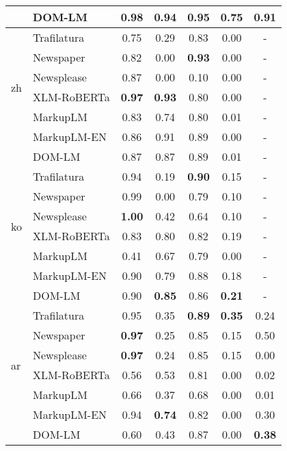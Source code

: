 \begin{tabular}{|l|l|ccccc|}
                    & DOM-LM      & \textbf{0.98} & 0.94 & 0.95 & \textbf{0.75} & \textbf{0.91}  \\ \hline                  
\multirow{6}{*}{zh} & Trafilatura & 0.75 & 0.29 & 0.83 & 0.00 & - \\
                    & Newspaper  & 0.82 & 0.00 & \textbf{0.93} & 0.00 & - \\
                    & Newsplease   & 0.87 & 0.00 & 0.10 & 0.00 & - \\
                    & XLM-RoBERTa & \textbf{0.97} & \textbf{0.93} & 0.80 & 0.00 & - \\
                    & MarkupLM    & 0.83 & 0.74 & 0.80 & 0.01 & -  \\
                    & MarkupLM-EN & 0.86 & 0.91 & 0.89 & 0.00 & -  \\
                    & DOM-LM      & 0.87 & 0.87 & 0.89 & 0.01 & -  \\ \hline
\multirow{6}{*}{ko} & Trafilatura & 0.94 & 0.19 & \textbf{0.90} & 0.15 & - \\
                    & Newspaper  & 0.99 & 0.00 & 0.79 & 0.10 & - \\
                    & Newsplease   & \textbf{1.00} & 0.42 & 0.64 & 0.10 & - \\
                    & XLM-RoBERTa & 0.83 & 0.80 & 0.82 & 0.19 & - \\
                    & MarkupLM    & 0.41 & 0.67 & 0.79 & 0.00 & -  \\
                    & MarkupLM-EN & 0.90 & 0.79 & 0.88 & 0.18 & -  \\
                    & DOM-LM      & 0.90 & \textbf{0.85} & 0.86 & \textbf{0.21} & - \\ \hline
\multirow{6}{*}{ar} & Trafilatura & 0.95 & 0.35 & \textbf{0.89} & \textbf{0.35} & 0.24 \\
                    & Newspaper  & \textbf{0.97} & 0.25 & 0.85 & 0.15 & 0.50 \\
                    & Newsplease   & \textbf{0.97} & 0.24 & 0.85 & 0.15 & 0.00 \\
                    & XLM-RoBERTa & 0.56 & 0.53 & 0.81 & 0.00 & 0.02 \\
                    & MarkupLM    & 0.66 & 0.37 & 0.68 & 0.00 & 0.01 \\
                    & MarkupLM-EN & 0.94 & \textbf{0.74} & 0.82 & 0.00 & 0.30 \\
                    & DOM-LM      & 0.60 & 0.43 & 0.87 & 0.00 & \textbf{0.38} \\ \hline
\end{tabular}